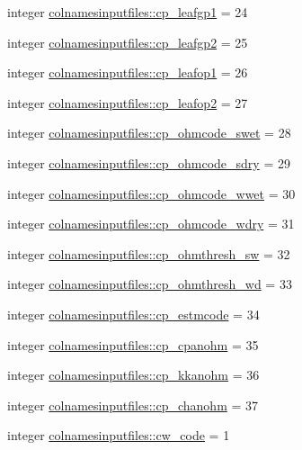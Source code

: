 \begin{DoxyCompactItemize}
integer \hyperlink{namespacecolnamesinputfiles_a159509b5d3aebdce404c1d633c77cc54}{colnamesinputfiles\+::cp\+\_\+leafgp1} = 24
\item 
integer \hyperlink{namespacecolnamesinputfiles_a394613531ccbb0e41502c17f17435c8b}{colnamesinputfiles\+::cp\+\_\+leafgp2} = 25
\item 
integer \hyperlink{namespacecolnamesinputfiles_a67a5fa87c0166fbdc3010b66754ebe05}{colnamesinputfiles\+::cp\+\_\+leafop1} = 26
\item 
integer \hyperlink{namespacecolnamesinputfiles_a2fe4a932f4a108d334a97a126858d0f9}{colnamesinputfiles\+::cp\+\_\+leafop2} = 27
\item 
integer \hyperlink{namespacecolnamesinputfiles_adfd708c99602ed3e4eb07b89fbf62318}{colnamesinputfiles\+::cp\+\_\+ohmcode\+\_\+swet} = 28
\item 
integer \hyperlink{namespacecolnamesinputfiles_aff9e0357ee213040201012147abcecac}{colnamesinputfiles\+::cp\+\_\+ohmcode\+\_\+sdry} = 29
\item 
integer \hyperlink{namespacecolnamesinputfiles_a92936eff685e2832c5c41afed024b7b9}{colnamesinputfiles\+::cp\+\_\+ohmcode\+\_\+wwet} = 30
\item 
integer \hyperlink{namespacecolnamesinputfiles_aaaa9971efe84bc6052765ab7ce221748}{colnamesinputfiles\+::cp\+\_\+ohmcode\+\_\+wdry} = 31
\item 
integer \hyperlink{namespacecolnamesinputfiles_ad9ce7d210b2b7e49fea86542362b5ab2}{colnamesinputfiles\+::cp\+\_\+ohmthresh\+\_\+sw} = 32
\item 
integer \hyperlink{namespacecolnamesinputfiles_a813cd1538cabdd1fad4f6ae8bc896f19}{colnamesinputfiles\+::cp\+\_\+ohmthresh\+\_\+wd} = 33
\item 
integer \hyperlink{namespacecolnamesinputfiles_a9d8a7aee77237f63b58fe379accd6ca9}{colnamesinputfiles\+::cp\+\_\+estmcode} = 34
\item 
integer \hyperlink{namespacecolnamesinputfiles_a20049a097f86cbe9cf312c3d3878d599}{colnamesinputfiles\+::cp\+\_\+cpanohm} = 35
\item 
integer \hyperlink{namespacecolnamesinputfiles_aa1d94ae99499960a4112975fef2b8461}{colnamesinputfiles\+::cp\+\_\+kkanohm} = 36
\item 
integer \hyperlink{namespacecolnamesinputfiles_a99f7646fb532e72d0b9ee394a0c6b959}{colnamesinputfiles\+::cp\+\_\+chanohm} = 37
\item 
integer \hyperlink{namespacecolnamesinputfiles_a6bfc20ed12c3fa0314aba2ba9a1bb72d}{colnamesinputfiles\+::cw\+\_\+code} = 1

\end{DoxyCompactItemize}
